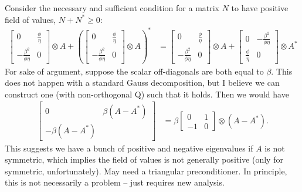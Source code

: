 \documentclass[a4paper,10pt]{article}
\begin{document}
Consider the necessary and sufficient condition for a matrix $N$ to have positive
field of values, $N+N^*\geq 0$:
%
\begin{align*}
\begin{bmatrix} 0 & \frac{\phi}{\eta} \\ -\frac{\beta^2}{\phi\eta} & 0 \end{bmatrix}
	\otimes A + \left(\begin{bmatrix} 0 & \frac{\phi}{\eta} \\ -\frac{\beta^2}{\phi\eta} & 0 \end{bmatrix}
	\otimes A\right)^*
& = \begin{bmatrix} 0 & \frac{\phi}{\eta} \\ -\frac{\beta^2}{\phi\eta} & 0 \end{bmatrix}
	\otimes A + \begin{bmatrix} 0 & -\frac{\beta^2}{\phi\eta} \\ \frac{\phi}{\eta} & 0 \end{bmatrix}
	\otimes A^*
\end{align*}
%
For sake of argument, suppose the scalar off-diagonals are both equal to $\beta$.
This does not happen with a standard Gauss decomposition, but I believe we can
construct one (with non-orthogonal Q) such that it holds. Then we would have
%
\begin{align*}
\begin{bmatrix} 0 & \beta(A - A^*) \\ -\beta(A - A^*) \end{bmatrix}
	& = \beta \begin{bmatrix} 0 & 1 \\ -1 & 0 \end{bmatrix}\otimes (A - A^*).
\end{align*}
%
This suggests we have a bunch of positive and negative eigenvalues if $A$ is not
symmetric, which implies the field of values is not generally positive (only for
symmetric, unfortunately). May need a triangular preconditioner. In principle,
this is not necessarily a problem -- just requires new analysis.
\end{document}
